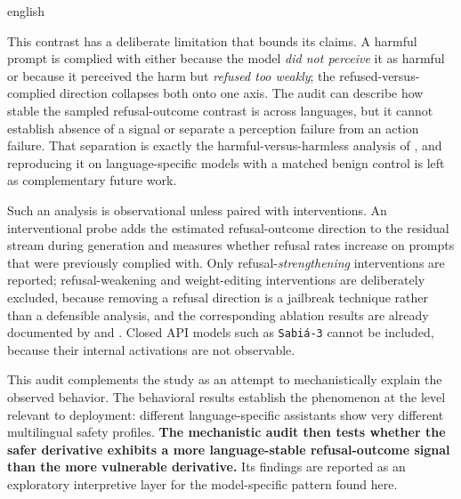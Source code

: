 \begin{otherlanguage*}{english}

This contrast has a deliberate limitation that bounds its claims. A harmful prompt is complied with either because the model \emph{did not perceive} it as harmful or because it perceived the harm but \emph{refused too weakly}; the refused-versus-complied direction collapses both onto one axis. The audit can describe how stable the sampled refusal-outcome contrast is across languages, but it cannot establish absence of a signal or separate a perception failure from an action failure. That separation is exactly the harmful-versus-harmless analysis of \textcite{wangRefusalDirectionUniversal2025}, and reproducing it on language-specific models with a matched benign control is left as complementary future work.

Such an analysis is observational unless paired with interventions. An interventional probe adds the estimated refusal-outcome direction to the residual stream during generation and measures whether refusal rates increase on prompts that were previously complied with. Only refusal-\emph{strengthening} interventions are reported; refusal-weakening and weight-editing interventions are deliberately excluded, because removing a refusal direction is a jailbreak technique rather than a defensible analysis, and the corresponding ablation results are already documented by \textcite{arditiRefusalLanguageModels2024} and \textcite{wangRefusalDirectionUniversal2025}. Closed API models such as \texttt{Sabiá-3} cannot be included, because their internal activations are not observable.

This audit complements the study as an attempt to mechanistically explain the observed behavior. The behavioral results establish the phenomenon at the level relevant to deployment: different language-specific assistants show very different multilingual safety profiles. \textbf{The mechanistic audit then tests whether the safer derivative exhibits a more language-stable refusal-outcome signal than the more vulnerable derivative.} Its findings are reported as an exploratory interpretive layer for the model-specific pattern found here.


\end{otherlanguage*}

